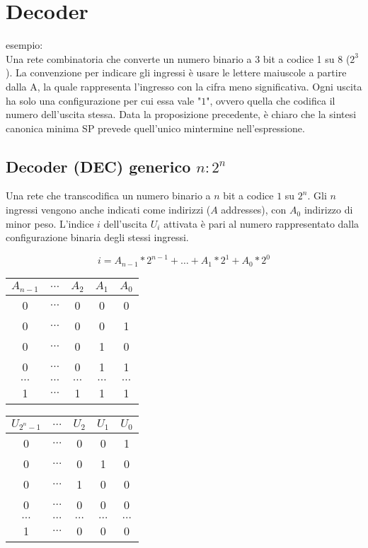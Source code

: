 \documentclass{article}
\begin{document}
\section{Decoder}

esempio:\\

\noindent
Una rete combinatoria che converte un numero binario a 3 bit a codice 1 su 8 ($2^3$).
La convenzione per indicare gli ingressi è usare le lettere maiuscole a partire dalla A, la quale rappresenta l'ingresso con la cifra meno significativa.
Ogni uscita ha solo una configurazione per cui essa vale "$1$", ovvero quella che codifica il numero dell'uscita stessa.
Data la proposizione precedente, è chiaro che la sintesi canonica minima SP prevede quell'unico mintermine nell'espressione.

\subsection{Decoder (DEC) generico $n:2^n$}

Una rete che transcodifica un numero binario a $n$ bit a codice $1$ su $2^n$.
Gli $n$ ingressi vengono anche indicati come indirizzi ($A$ addresses), con $A_0$ indirizzo di minor peso.
L'indice $i$ dell'uscita $U_i$ attivata è pari al numero rappresentato dalla configurazione binaria degli stessi ingressi.

$$
i = A_{n-1} * 2^{n-1} + \dots + A_1 * 2^1 + A_0 * 2^0
$$

\begin{center}
\begin{tabular}{ |c|c|c|c|c| }
\hline
$A_{n-1}$ & $\dots$ & $A_2$ & $A_1$ & $A_0$ \\
\hline
\hline
0 & $\dots$ & 0 & 0 & 0 \\
0 & $\dots$ & 0 & 0 & 1 \\
0 & $\dots$ & 0 & 1 & 0 \\
0 & $\dots$ & 0 & 1 & 1 \\
$\dots$ & $\dots$ & $\dots$ & $\dots$ & $\dots$ \\
1 & $\dots$ & 1 & 1 & 1 \\
\hline
\end{tabular}
\end{center}

\begin{center}
\begin{tabular}{ |c|c|c|c|c| }
\hline
$U_{2^n-1}$ & $\dots$ & $U_2$ & $U_1$ & $U_0$ \\
\hline
\hline
0 & $\dots$ & 0 & 0 & 1 \\
0 & $\dots$ & 0 & 1 & 0 \\
0 & $\dots$ & 1 & 0 & 0 \\
0 & $\dots$ & 0 & 0 & 0 \\
$\dots$ & $\dots$ & $\dots$ & $\dots$ & $\dots$ \\
1 & $\dots$ & 0 & 0 & 0 \\
\hline
\end{tabular}
\end{center}
\end{document}
